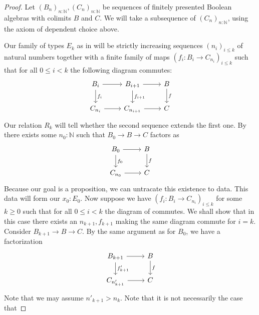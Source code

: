 \documentclass{../util/zariski-small}
\begin{document}
\begin{proof}
  Let $(B_n)_{n:\mathbb N}, (C_n)_{n:\mathbb N}$ be 
  sequences of finitely presented Boolean algebras with colimits $B$ and $C$. 
  We will take a subsequence of $(C_n)_{n:\mathbb N}$, using the axiom of dependent choice above. 

  Our family of types $E_k$ as in  
  will be strictly increasing sequences $(n_i)_{i\leq k}$ of natural numbers together with a finite family of maps 
  $(f_i: B_{i} \to C_{n_i})_{i\leq k}$ such that
  for all $0\leq i<k$ the following diagram commutes:
  \begin{equation}\label{eqnDecompositionOfColimitMorphisms}
    \begin{tikzcd}
      B_{i} \arrow[r] \arrow[d, "f_i"]& B_{{i+1}} \arrow[r] \arrow[d,"f_{i+1}"]& B \arrow[d,"f"] \\
      C_{n_i} \arrow[r] & C_{n_{i+1}} \arrow[r] & C 
    \end{tikzcd}
  \end{equation}
  Our relation $R_k$ will tell whether the second sequence extends the first one. 
%
  By  
  there exists some $n_0:\mathbb N$ 
  such that $B_0 \to B \to C$ factors as 
  \begin{equation}
    \begin{tikzcd}
      B_{0} \arrow[r] \arrow[d, "f_0"]& B \arrow[d,"f"] \\
      C_{n_0} \arrow[r] & C 
    \end{tikzcd}
  \end{equation}
  Because our goal is a proposition, we can untracate this existence to data. 
  This data will form our $x_0:E_0$. %
%
  Now suppose we have $(f_i: B_{i} \to C_{n_i})_{i\leq k}$ for some $k\geq 0$ 
  such that
  for all $0\leq i<k$ the diagram of  commutes.
  We shall show that in this case there exists an $n_{k+1}, f_{k+1}$ 
  making the same diagram commute for $i = k$. 
  Consider $B_{{k}+1}\to B \to C$. By the same argument as for $B_0$, we have a factorization 
  \begin{equation}
    \begin{tikzcd}
    B_{k+1} \arrow[r]  \arrow[d,"f'_{k+1}"]& B \arrow[d,"f"]\\
    C_{n'_{k+1}} \arrow[r] & C
    \end{tikzcd}
  \end{equation}
  Note that we may assume $n'_{k+1} > n_k$.
  Note that it is not necessarily the case that 

\end{proof}
\end{document}
